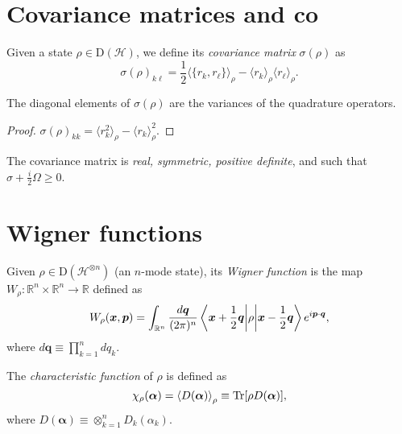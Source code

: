 \documentclass[a4paper]{report}
\newcommand{\RR}{\mathbb{R}}
\newcommand{\bs}[1]{\boldsymbol{#1}}
\newcommand{\calH}{{\mathcal{H}}}
\newcommand{\rmD}{{\mathrm{D}}}
\begin{document}
\section{Covariance matrices and co}

\begin{defn}
	Given a state $\rho\in\rmD(\calH)$,
	we define its \emph{covariance matrix} $\sigma(\rho)$ as
	\begin{equation}
		\sigma(\rho)_{k\ell}
		= \frac12 \langle \{ r_k, r_\ell\}\rangle_\rho
		- \langle r_k\rangle_\rho \langle r_\ell\rangle_\rho.
	\end{equation}
\end{defn}

\begin{prop}
	The diagonal elements of $\sigma(\rho)$ are the variances of the quadrature operators.
\end{prop}
\begin{proof}
	$\sigma(\rho)_{kk} = \langle r_k^2\rangle_\rho - \langle r_k\rangle_\rho^2.$
\end{proof}

\begin{prop}
	The covariance matrix is \emph{real, symmetric, positive definite}, and such that $\sigma+\frac{i}{2}\Omega\ge0$.
\end{prop}

\section{Wigner functions}

\begin{defn}
	Given $\rho\in\rmD(\calH^{\otimes n})$ (an $n$-mode state), its \emph{Wigner function} is the map $W_\rho:\RR^{n}\times\RR^n\to \RR$ defined as
	\begin{equation}
		W_\rho(\bs x,\bs p)
		= \int_{\RR^n} \frac{d\bs q}{(2\pi)^n}
		\mel{\bs x+\frac12\bs q}{\rho}{\bs x-\frac12 \bs q}
		e^{i \bs p\cdot\bs q},
	\end{equation}
	where $d\bs q\equiv \prod_{k=1}^n dq_k$.
\end{defn}

\begin{defn}
	The \emph{characteristic function} of $\rho$ is defined as
	\begin{equation}
		\chi_\rho(\bs\alpha)
		= \expval{D(\bs\alpha)}_\rho
		\equiv \Tr[\rho D(\bs\alpha)],
	\end{equation}
	where $D(\bs\alpha)\equiv \otimes_{k=1}^n D_k(\alpha_k)$.
\end{defn}
\end{document}
